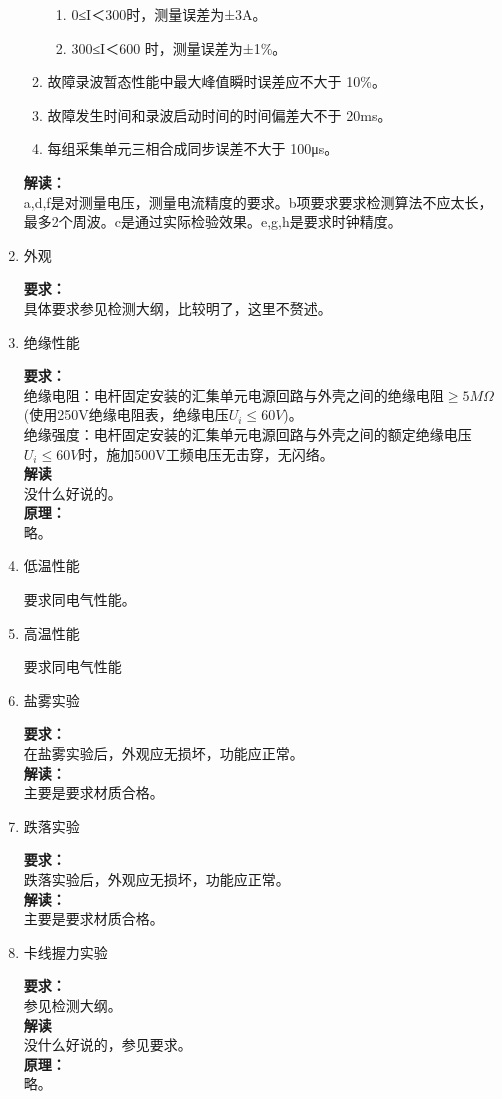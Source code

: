 \documentclass{article}
\begin{document}
\begin{CJK}{UTF8}{gbsn}
\begin{enumerate}
\begin{enumerate}
					\begin{enumerate}	
						\item 0≤I＜300时，测量误差为±3A。 
						\item 300≤I＜600 时，测量误差为±1\%。 
					\end{enumerate}
				\item 故障录波暂态性能中最大峰值瞬时误差应不大于 10\%。 
				\item 故障发生时间和录波启动时间的时间偏差大不于 20ms。 
				\item 每组采集单元三相合成同步误差不大于 100μs。 
		\end{enumerate}
		\textbf{解读：}\\
		a,d,f是对测量电压，测量电流精度的要求。b项要求要求检测算法不应太长，最多2个周波。c是通过实际检验效果。e,g,h是要求时钟精度。
	\item 外观 
	\par
	\textbf{要求：}\\
	具体要求参见检测大纲，比较明了，这里不赘述。

\item 绝缘性能
	\par
	\textbf{要求：}\\
	绝缘电阻：电杆固定安装的汇集单元电源回路与外壳之间的绝缘电阻$\geq 5M\Omega$(使用250V绝缘电阻表，绝缘电压$U_i\leq 60V$)。\\
	绝缘强度：电杆固定安装的汇集单元电源回路与外壳之间的额定绝缘电压$U_i \leq 60V$时，施加500V工频电压无击穿，无闪络。\\
	\textbf{解读}\\
	没什么好说的。\\
	\textbf{原理：}\\
	略。

\item 低温性能
	\par
	要求同电气性能。
\item 高温性能
	\par
	要求同电气性能
\item 盐雾实验
	\par
	\textbf{要求：}\\
	在盐雾实验后，外观应无损坏，功能应正常。\\
	\textbf{解读：}\\
	主要是要求材质合格。
\item 跌落实验
	\par
	\textbf{要求：}\\
	跌落实验后，外观应无损坏，功能应正常。\\
	\textbf{解读：}\\
	主要是要求材质合格。
\item 卡线握力实验
	\par
	\textbf{要求：}\\
	参见检测大纲。\\
	\textbf{解读}\\
	没什么好说的，参见要求。\\
	\textbf{原理：}\\
	略。


\end{enumerate}
\end{CJK}
\end{document}
